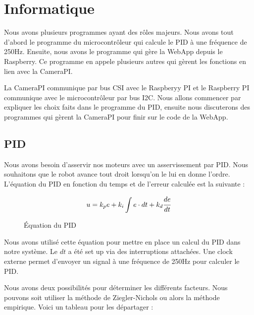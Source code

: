\documentclass[
	a4paper,									%
	11pt,										%
	twoside,									%
	openright,									%
	notitlepage,									%
	parskip=half,								%
]{scrreprt}										%
\begin{document}
\chapter{Informatique}

Nous avons plusieurs programmes ayant des rôles majeurs. Nous avons tout d'abord le programme du 
microcontrôleur qui calcule le PID à une fréquence de 250Hz. Ensuite, nous avons le programme qui gère
la WebApp depuis le Raspberry. Ce programme en appele plusieurs autres qui gèrent les fonctions en lien 
avec la CameraPI. \par

La CameraPI communique par bus CSI avec le Raspberyy PI et le Raspberry PI communique avec le microcontrôleur
par bus I2C. Nous allons commencer par expliquer les choix faits dans le programme du PID, ensuite nous discuterons
des programmes qui gèrent la CameraPI pour finir sur le code de la WebApp. \par


\section{PID}

Nous avons besoin d'asservir nos moteurs avec un asservissement par PID. Nous souhaitons que le robot avance
tout droit lorsqu'on le lui en donne l'ordre. L'équation du PID en fonction du temps et de l'erreur calculée 
est la suivante : 

\begin{figure}[h]
	\[u=k_pe + k_i \int e \cdot dt + k_d \cfrac{de}{dt}\] 
	\caption{Équation du PID}
	\label{eq1}
\end{figure}

Nous avons utilisé cette équation pour mettre en place un calcul du PID dans notre système. Le $dt$ a été 
set up via des interruptions attachées. Une clock externe permet d'envoyer un signal à une fréquence de 250Hz
pour calculer le PID. \par

Nous avons deux possibilités pour déterminer les différents facteurs. Nous pouvons soit utiliser la méthode 
de Ziegler-Nichols ou alors la méthode empirique. Voici un tableau pour les départager : 
\end{document}
